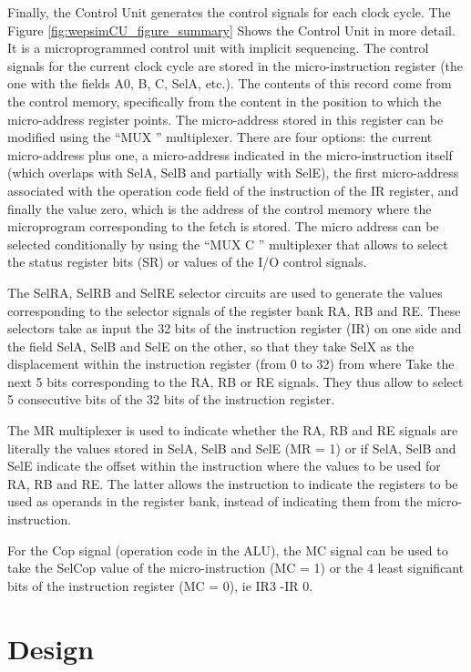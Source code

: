 Finally, the Control Unit generates the control signals for each clock cycle. The Figure \ref{fig:wepsimCU_figure_summary} Shows the Control Unit in more detail. It is a microprogrammed control unit with implicit sequencing. The control signals for the current clock cycle are stored in the micro-instruction register (the one with the fields A0, B, C, SelA, etc.). The contents of this record come from the control memory, specifically from the content in the position to which the micro-address register points. The micro-address stored in this register can be modified using the ``MUX '' multiplexer. There are four options: the current micro-address plus one, a micro-address indicated in the micro-instruction itself (which overlaps with SelA, SelB and partially with SelE), the first micro-address associated with the operation code field of the instruction of the IR register, and finally the value zero, which is the address of the control memory where the microprogram corresponding to the fetch is stored. The micro address can be selected conditionally by using the ``MUX C '' multiplexer that allows to select the status register bits (SR) or values of the I/O control signals. 

The SelRA, SelRB and SelRE selector circuits are used to generate the values corresponding to the selector signals of the register bank RA, RB and RE. These selectors take as input the 32 bits of the instruction register (IR) on one side and the field SelA, SelB and SelE on the other, so that they take SelX as the displacement within the instruction register (from 0 to 32) from where Take the next 5 bits corresponding to the RA, RB or RE signals. They thus allow to select 5 consecutive bits of the 32 bits of the instruction register.

The MR multiplexer is used to indicate whether the RA, RB and RE signals are literally the values stored in SelA, SelB and SelE (MR = 1) or if SelA, SelB and SelE indicate the offset within the instruction where the values to be used for RA, RB and RE. The latter allows the instruction to indicate the registers to be used as operands in the register bank, instead of indicating them from the micro-instruction.

For the Cop signal (operation code in the ALU), the MC signal can be used to take the SelCop value of the micro-instruction (MC = 1) or the 4 least significant bits of the instruction register (MC = 0), ie IR3 -IR 0.

\section{Design}

